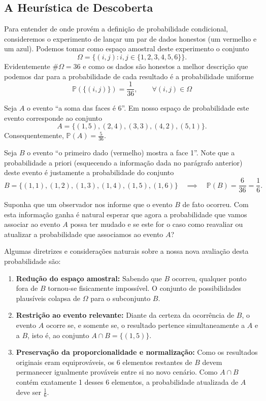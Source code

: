 \documentclass[12pt,portuguese]{article}
\theoremstyle{definition}
\begin{document}
\subsection{A Heurística de Descoberta}

Para entender de onde provém a definição de probabilidade condicional, consideremos o experimento de lançar um par de dados honestos (um vermelho e um azul). Podemos tomar como espaço amostral deste experimento o conjunto
\[
  \Omega = \{(i,j) : i,j \in \{1,2,3,4,5,6\}\}.
\]
Evidentemente \(\#\Omega = 36\) e como os dados são honestos 
a melhor descrição que podemos dar para a probabilidade de cada resultado 
é a probabilidade uniforme 
\[
\mathbb{P}(\{(i,j)\}) = \frac{1}{36}, \qquad \forall (i,j)\in\Omega
\]

Seja \(A\) o evento ``a soma das faces é 6''. Em nosso espaço de probabilidade 
este evento corresponde ao conjunto 
\[
  A = \{(1,5), (2,4), (3,3), (4,2), (5,1)\}.
\]
Consequentemente, \(\mathbb{P}(A) = \displaystyle\frac{5}{36}\). 

\medskip 
Seja \(B\) o evento ``o primeiro dado (vermelho) mostra a face 1''. Note que a probabilidade a priori 
(esquecendo a informação dada no parágrafo anterior)
deste evento é justamente a probabilidade do conjunto 
\[
  B = \{(1,1), (1,2), (1,3), (1,4), (1,5), (1,6)\}
  \quad\implies\quad
  \mathbb{P}(B) = \frac{6}{36} = \frac{1}{6}.
\]

Suponha que um observador nos informe que o evento \(B\) de fato ocorreu. 
Com esta informação ganha é natural esperar que agora a probabilidade que vamos associar ao evento $A$
possa ter mudado e se este for o caso como reavaliar ou atualizar a probabilidade que associamos ao
evento \(A\)?

Algumas diretrizes e considerações naturais sobre a nossa nova avaliação desta probabilidade são:

\begin{enumerate}[label=(\roman*)]
  \item \textbf{Redução do espaço amostral:} Sabendo que \(B\) ocorreu, qualquer ponto fora de \(B\) tornou-se fisicamente impossível. O conjunto de possibilidades plausíveis colapsa de \(\Omega\) para o subconjunto \(B\).
  \item \textbf{Restrição ao evento relevante:} Diante da certeza da ocorrência de \(B\), o evento \(A\) ocorre se, e somente se, o resultado pertence simultaneamente a \(A\) e a \(B\), isto é, ao conjunto \(A \cap B = \{(1,5)\}\).
  \item \textbf{Preservação da proporcionalidade e normalização:} Como os resultados originais eram equiprováveis, os 6 elementos restantes de \(B\) devem permanecer igualmente prováveis entre si no novo cenário. Como \(A \cap B\) contém exatamente 1 desses 6 elementos, a probabilidade atualizada de \(A\) deve ser 
  $\frac{1}{6}$.
\end{enumerate}
\end{document}
